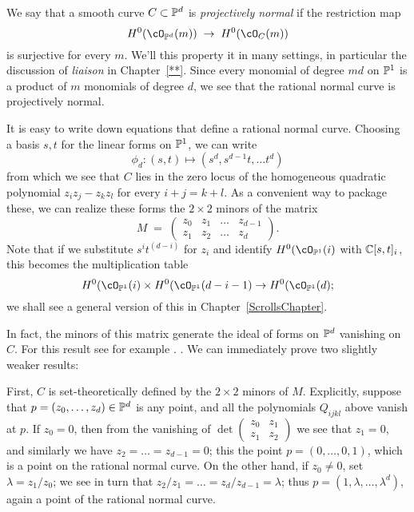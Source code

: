 We say that a smooth curve $C \subset \PP^d$ is \emph{projectively normal} if the restriction map
$$
H^0(\cO_{\PP^d}(m)) \; \to \; H^0(\cO_{C}(m)) 
$$
is surjective for every $m$. We'll this property it in many settings, in particular the discussion of \emph{liaison} in Chapter~\ref{**}.
Since every monomial of degree $md$ on $\PP^1$ is a product of $m$ monomials of degree $d$, we see that the rational normal curve is projectively normal. 

It is easy to write down equations that define a rational normal curve. Choosing a basis $s,t$ for the linear forms on $\PP^1$, we can write
$$
\phi_d : (s,t) \mapsto (s^d, s^{d-1}t,\dots t^d)
$$
from which we see that $C$ lies in the zero locus of the homogeneous quadratic polynomial $z_iz_j - z_kz_l$ for every $i+j=k+l$. As a convenient way to package these, we can realize these forms the $2\times 2$ minors of the matrix
$$
M \; = \; \begin{pmatrix}
z_0 & z_1 & \dots & z_{d-1} \\
z_1 & z_2 & \dots & z_d
\end{pmatrix}.
$$
Note that if we substitute $s^it^{(d-i)}$ for $z_i$ and identify $H^0(\cO_{\PP^1}(i)$ with $\CC[s,t]_i$, this becomes the multiplication table
$$
H^0(\cO_{\PP^1}(i) \times H^0(\cO_{\PP^1}(d-i-1) \to H^0(\cO_{\PP^1}(d);
$$
we shall see a general version of this in Chapter~\ref{ScrollsChapter}. 

In fact, the minors of this matrix generate the ideal of forms on $\PP^d$ vanishing on $C$. For this result see for example \cite[****]{E}. .
We can immediately prove two slightly weaker results:

First, $C$ is set-theoretically defined by the $2\times 2$ minors of $M$. Explicitly, suppose that $p = (z_0,\dots,z_d) \in \PP^d$ is any point, and all the polynomials $Q_{ijkl}$ above vanish at $p$. If $z_0 = 0$, then from the vanishing of 
$\det \begin{pmatrix}
z_0 & z_1  \\
z_1 & z_2 
\end{pmatrix}$ 
we see that $z_1 = 0$, and similarly we have $z_2 = \dots = z_{d-1}=0$; this the point $p = (0,\dots,0,1)$, which is a point on the rational normal curve. On the other hand, if $z_0 \neq 0$, set $\lambda = z_1/z_0$; we see in turn that $z_2/z_1 = \dots = z_d/z_{d-1} = \lambda$; thus $p = (1, \lambda, \dots,\lambda^d)$, again a point of the rational normal curve.

